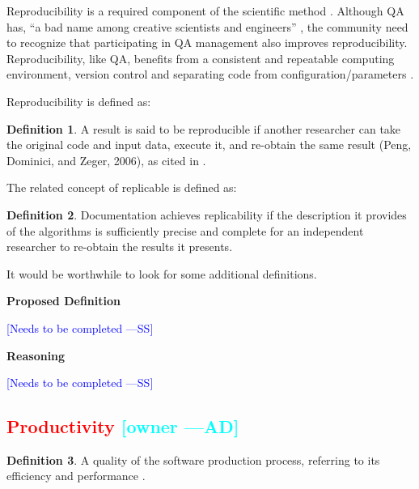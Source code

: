 \documentclass[letterpaper,cleveref]{lipics-v2019}
\newcommand{\authornote}[3]{\textcolor{#1}{[#3 ---#2]}}
\newcommand{\authornote}[3]{}
\newcommand{\wss}[1]{\authornote{blue}{SS}{#1}} %
\newcommand{\ad}[1]{\authornote{cyan}{AD}{#1}} %
\newcommand{\notdone}[1]{\textcolor{red}{#1}}
\theoremstyle{definition}
\newtheorem{defn}{Definition}
\begin{document}
Reproducibility is a required component of the scientific method
\citep{Davison2012}.  Although QA has, ``a bad name among creative scientists
and engineers'' \citep[p.~352]{Roache1998}, the community need to recognize that
participating in QA management also improves reproducibility.  Reproducibility,
like QA, benefits from a consistent and repeatable computing environment,
version control and separating code from configuration/parameters
\citep{Davison2012}.

Reproducibility is defined as:

\begin{defn}
  A result is said to be reproducible if another researcher can take the
  original code and input data, execute it, and re-obtain the same result (Peng,
  Dominici, and Zeger, 2006), as cited in \citet{BenureauAndRougier2017}.
\end{defn}

The related concept of replicable is defined as:

\begin{defn}
  Documentation achieves replicability if the description it provides of the
  algorithms is sufficiently precise and complete for an independent researcher
  to re-obtain the results it presents.  \citep{BenureauAndRougier2017}
\end{defn}

It would be worthwhile to look for some additional definitions.

\noindent \textbf{Proposed Definition} 

\wss{Needs to be completed}

\noindent \textbf{Reasoning}

\wss{Needs to be completed}

\subsection{\notdone{Productivity} \ad{owner}}

\begin{defn}
  A quality of the software production process, referring to its efficiency and
  performance \citep{ghezzi1991fundamentals}.
\end{defn}
\end{document}
